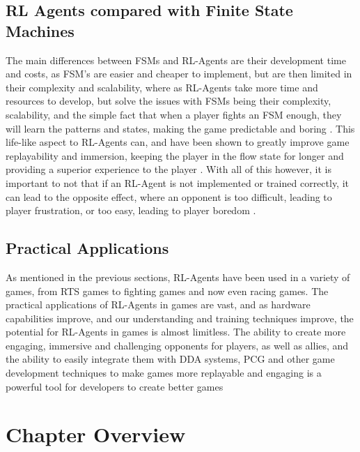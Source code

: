 \begin{spacing}{2.0}
	\subsection{RL Agents compared with Finite State Machines}

	The main differences between FSMs and RL-Agents are their development time and costs, as FSM's are easier and cheaper to implement, but are then limited in their complexity and scalability, where as RL-Agents
	take more time and resources to develop, but solve the issues with FSMs being their complexity, scalability, and the simple fact that when a player fights an FSM enough, they will learn the patterns and states,
	making the game predictable and boring \cite{grech_creating_2023} \cite{bin_ramlan_implementation_2021} \cite{metz_evaluation_2020}. This life-like aspect to RL-Agents can, and have been shown to greatly improve game replayability and immersion, keeping the player in the flow state for longer
	and providing a superior experience to the player \cite{grech_creating_2023} \cite{bin_ramlan_implementation_2021} \cite{metz_evaluation_2020}. With all of this however, it is important to not that if an RL-Agent is not implemented or trained correctly, it can lead to the opposite effect,
	where an opponent is too difficult, leading to player frustration, or too easy, leading to player boredom \cite{grech_creating_2023} \cite{bin_ramlan_implementation_2021} \cite{metz_evaluation_2020}.

	\subsection{Practical Applications}

	As mentioned in the previous sections, RL-Agents have been used in a variety of games, from RTS games to fighting games and now even racing games. The practical applications of RL-Agents in games are vast,
	and as hardware capabilities improve, and our understanding and training techniques improve, the potential for RL-Agents in games is almost limitless. The ability to create more engaging, immersive and challenging
	opponents for players, as well as allies, and the ability to easily integrate them with DDA systems, PCG and other game development techniques to make games more replayable and engaging is a powerful tool for developers
	to create better games \cite{grech_creating_2023} \cite{borg_investigating_2020} \cite{zhasulanov_enhancing_2024} \cite{raut_unity_2024} \cite{metz_evaluation_2020}

	\section{Chapter Overview}


\end{spacing}
